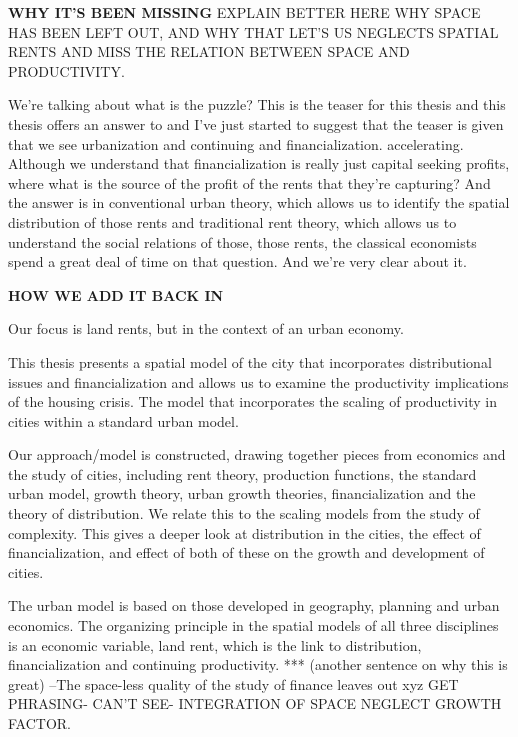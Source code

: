 \textbf{WHY IT'S BEEN MISSING}
EXPLAIN BETTER HERE WHY SPACE HAS BEEN LEFT OUT, AND WHY THAT LET'S US NEGLECTS SPATIAL RENTS AND MISS THE RELATION BETWEEN SPACE AND PRODUCTIVITY.

We're talking about what is the puzzle? This is the teaser for this thesis and this thesis offers an answer to and I've just started to suggest that the teaser is given that we see urbanization and continuing and financialization. accelerating. Although we understand that financialization is really just capital seeking profits, where what is the source of the profit of the rents that they're capturing? And the answer is in conventional urban theory, which allows us to identify the spatial distribution of those rents and traditional rent theory, which allows us to understand the social relations of those, those rents, the classical economists spend a great deal of time on that question. And we're very clear about it.

\textbf{HOW WE ADD IT BACK IN}

Our focus is land rents, but in the context of an urban economy. 

This thesis presents a spatial model of the city that incorporates distributional issues and financialization and allows us to examine the productivity implications of the housing crisis. The model that incorporates the scaling of productivity in cities within a standard urban model. 

Our approach/model is constructed, drawing together pieces from %
economics and the study of cities, including rent theory, production functions, the standard urban model, growth theory, urban growth theories, financialization and the theory of distribution.
We relate this to the scaling models from the study of complexity. This gives a deeper look at distribution in the cities, the effect of financialization, and effect of both of these on the growth and development of cities. 

The urban model is based on those developed in geography, planning and urban economics. The organizing principle in  the spatial models of all three disciplines is an economic variable, land rent, which is the link to distribution, financialization and continuing productivity. *** (another sentence on why this is great)
--The space-less quality of the study of finance leaves out xyz GET PHRASING- CAN'T SEE- INTEGRATION OF SPACE NEGLECT GROWTH FACTOR. 





